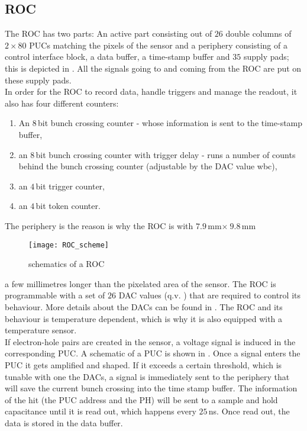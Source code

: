 \subsection{\acs{ROC}}\label{sroc}
The \ac{ROC} has two parts: An active part consisting out of $26$ double columns of $2\times80$ \ac{PUC}s matching the pixels of the sensor and a periphery consisting of a control interface block, a data buffer, a time-stamp buffer and $35$ supply pads; this is depicted in . All the signals going to and coming from the \ac{ROC} are put on these supply pads.\\
In order for the \ac{ROC} to record data, handle triggers and manage the readout, it also has four different counters:
\begin{enumerate}
	\item An $8\,$bit bunch crossing counter - whose information is sent to the time-stamp buffer,
	\item an $8\,$bit bunch crossing counter with trigger delay - runs a number of counts behind the bunch crossing counter (adjustable by the \ac{DAC} value wbc),
	\item an $4\,$bit trigger counter,
	\item an $4\,$bit token counter.
\end{enumerate}\par
The periphery is the reason is why the \ac{ROC} is with $7.9\,$mm$\times\ 9.8\,$mm 
\begin{wrapfigure}{l}{7.2cm}
	\vspace*{-10pt}
	\texttt{[image: ROC\_scheme]}
	\caption{schematics of a \ac{ROC} \cite{psi46chip}}
	\label{p8}
	\vspace*{-5pt}
\end{wrapfigure}  
a few millimetres longer than the pixelated area of the sensor. The \ac{ROC} is programmable with a set of  $26$ \ac{DAC} values (q.v. ) that are required to control its behaviour. More details about the \ac{DAC}s can be found in . The \ac{ROC} and its behaviour is temperature dependent, which is why it is also equipped with a temperature sensor.\\
If electron-hole pairs are created in the sensor, a voltage signal is induced in the corresponding \ac{PUC}. A schematic of a \ac{PUC} is shown in . Once a signal enters the \ac{PUC} it gets amplified and shaped. If it exceeds a certain threshold, which is tunable with one the \ac{DAC}s, a signal is immediately sent to the periphery that will save the current bunch crossing into the time stamp buffer. The information of the hit (the \ac{PUC} address and the \ac{PH}) will be sent to a sample and hold capacitance until it is read out, which happens every $25\,$ns. Once read out, the data is stored in the data buffer.\\ 
